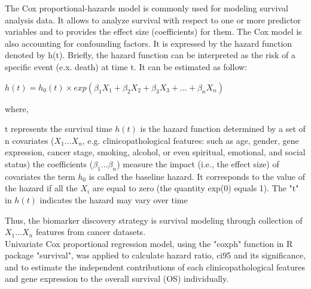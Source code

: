 \documentclass[jpm,article,submit,moreauthors,pdftex]{Definitions/mdpi}
\newenvironment{MyColorPar}[1]{%
    \leavevmode\color{#1}\ignorespaces%
}{%
}%
\begin{document}
\begin{paracol}{2}
\begin{MyColorPar}{red}
The Cox proportional-hazards model\cite{Cox1972}\cite{Andersen1982} is commonly used for modeling survival analysis data. It allows to analyze survival with respect to one or more predictor variables and to provides the effect size (coefficients) for them\cite{Bradburn2003b}. %
The Cox model is also accounting for confounding factors\cite{Magen2019}.
It is expressed by the hazard function denoted by h(t). Briefly, the hazard function can be interpreted as the risk of a specific event (e.x. death) at time t. It can be estimated as follow:

\begin{flushleft}

$h(t) = h_0(t) \times exp(\beta_1 X_1 + \beta_2 X_2 + \beta_3 X_3 + ... + \beta_n X_n)$\\[0.3cm]
\end{flushleft}
where,\\
\begin{outline} %
\1 t represents the survival time
\1 $h(t)$ is the hazard function determined by a set of n covariates ($X_1...X_n$, e.g. clinicopathological features: such as age, gender, gene expression, cancer stage, smoking, alcohol, or even spiritual, emotional, and social status)
\1 the coefficients ($\beta_1...\beta_n$) measure the impact (i.e., the effect size) of covariates
\1 the term $h_0$ is called the baseline hazard. It corresponds to the value of the hazard if all the $X_i$ are equal to zero (the quantity exp(0) equals 1). The "t" in $h(t)$ indicates the hazard may vary over time
\end{outline}

Thus, the biomarker discovery strategy is survival modeling through collection of $X_1...X_n$ features from cancer datasets.\\[1cm]

Univariate Cox proportional regression model, using the "coxph" function in R package "survival", was applied to calculate hazard ratio, \acrfull{ci95} and its significance, and to estimate the independent contributions of each clinicopathological features and gene expression to the overall survival (OS) individually.


\end{MyColorPar}
\end{paracol}
\end{document}
